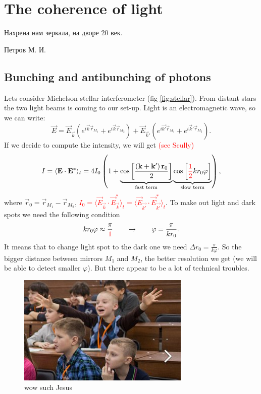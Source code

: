 \section{The coherence of light}

\begin{otherlanguage}{russian}
	\epigraph{Нахрена нам зеркала, на дворе 20 век.}{Петров М. И.}
\end{otherlanguage}

\subsection{Bunching and antibunching of photons}

Lets consider Michelson stellar interferometer (fig \ref{fig:stellar}). From distant stars the two light beams is coming to our set-up. Light is an electromagnetic wave, so we can write:
\begin{equation}
	\vec{E} = \vec{E}_{\vec{k}} \left( e^{i \vec{k} \vec{r}_{M_1}}  + e^{i \vec{k} \vec{r}_{M_2}} \right) + \vec{E}_{\vec{k}'} \left( e^{i \vec{k'} \vec{r}_{M_1}} + e^{i \vec{k}' \vec{r}_{M_2}} \right).
\end{equation}
If we decide to compute the intensity, we will get { \textcolor{red} {(see Scully)}}
\begin{equation}
	I = \langle \mathbf{E} \cdot \mathbf{E}^* \rangle_t  = 4 I_0 \left( 1 + \underbrace{\cos \left[\frac{\left( \mathbf{k} + \mathbf{k}' \right) \mathbf{r}_0}{2}\right]}_{\text{fast term}} \underbrace{\cos \left[{\textcolor{red}{\frac{1}{2}}}  k r_0 \varphi \right]}_{\text{slow term}} \right),
\end{equation}
where $\vec{r}_0 = \vec{r}_{M_1} - \vec{r}_{M_2}$, {\textcolor{red}{$I_0=\langle \vec{E}_{\vec{k}} \cdot \vec{E}_{\vec{k}}^* \rangle_t=\langle \vec{E}_{\vec{k'}} \cdot \vec{E}_{\vec{k'}}^* \rangle_t$}}. To make out light and dark spots we need the following condition
\begin{equation}
	k r_0 \varphi \approx \frac{\pi}{{\textcolor{red} 1}} \qquad \to \qquad \varphi = \frac{\pi}{k r_0}.
\end{equation}
It means that to change light spot to the dark one  we need $\Delta r_0 = \frac{\pi}{k \varphi}$. So the bigger distance between mirrors $M_1$ and $M_2$, the better resolution we get (we will be able to detect smaller $\varphi$). But there appear to be a lot of technical troubles.
\begin{figure}
	\centering
	\includegraphics[width=0.5\linewidth]{fig/L3/Ij8NUO6Gat0}
	\caption{wow such Jesus}
	\label{fig:jesus}
\end{figure}

